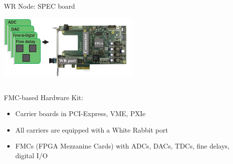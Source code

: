 \documentclass[compress,red]{beamer}
\begin{document}
\begin{frame}{WR Node: SPEC board}

    \begin{center}
    \includegraphics[width=7cm]{../../figures/node/spec.jpg}
    \end{center}

  \begin{columns}[c]

	\begin{block}{FMC-based Hardware Kit:}
	  \begin{itemize}
	  \item Carrier boards in PCI-Express, VME, PXIe
	  \item All carriers are equipped with a White Rabbit port
	  \item FMCs (FPGA Mezzanine Cards) with ADCs, DACs, TDCs, fine delays, digital I/O
	  \end{itemize}
	\end{block}

  \end{columns}


\end{frame}
\end{document}
